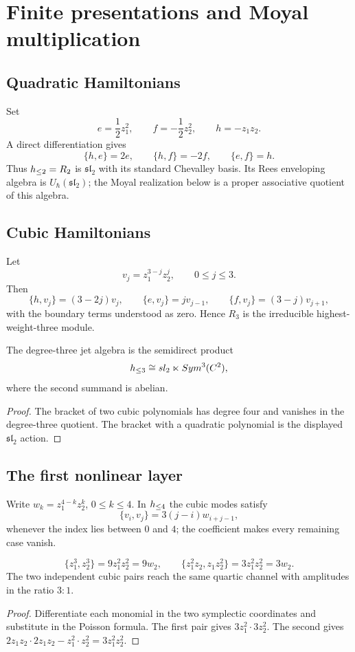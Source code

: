 \chapter{Finite presentations and Moyal multiplication}
\section{Quadratic Hamiltonians}
Set
\[
 e=\frac12z_1^2,
 \qquad
 f=-\frac12z_2^2,
 \qquad
 h=-z_1z_2.
\]
A direct differentiation gives
\[
 \{h,e\}=2e,
 \qquad
 \{h,f\}=-2f,
 \qquad
 \{e,f\}=h.
\]
Thus $h_{\le2}=R_2$ is $\mathfrak{sl}_2$ with its standard
Chevalley basis.  Its Rees enveloping algebra is
$U_\hbar(\mathfrak{sl}_2)$; the Moyal realization below is a proper
associative quotient of this algebra.

\section{Cubic Hamiltonians}
Let
\[
 v_j=z_1^{3-j}z_2^j,
 \qquad 0\le j\le3.
\]
Then
\[
 \{h,v_j\}=(3-2j)v_j,
 \qquad
 \{e,v_j\}=jv_{j-1},
 \qquad
 \{f,v_j\}=(3-j)v_{j+1},
\]
with the boundary terms understood as zero.  Hence $R_3$ is the irreducible highest-weight-three module.

\begin{proposition}
The degree-three jet algebra is the semidirect product
\[
 h_{\le3}\cong sl_2\ltimes Sym^3(C^2),
\]
where the second summand is abelian.
\end{proposition}
\begin{proof}
The bracket of two cubic polynomials has degree four and vanishes in the degree-three quotient.  The bracket with a quadratic polynomial is the displayed $\mathfrak{sl}_2$ action.
\end{proof}

\section{The first nonlinear layer}
Write $w_k=z_1^{4-k}z_2^k$, $0\le k\le4$.  In $h_{\le4}$ the cubic modes satisfy
\begin{equation}\label{eq:vol2-cubic-quartic}
 \{v_i,v_j\}=3(j-i)w_{i+j-1},
\end{equation}
whenever the index lies between $0$ and $4$; the coefficient makes every remaining case vanish.

\begin{calculation}
\[
 \{z_1^3,z_2^3\}=9z_1^2z_2^2=9w_2,
 \qquad
 \{z_1^2z_2,z_1z_2^2\}=3z_1^2z_2^2=3w_2.
\]
The two independent cubic pairs reach the same quartic channel with amplitudes in the ratio $3:1$.
\end{calculation}
\begin{proof}
Differentiate each monomial in the two symplectic coordinates and substitute in the Poisson formula.  The first pair gives $3z_1^2\cdot3z_2^2$.  The second gives $2z_1z_2\cdot2z_1z_2-z_1^2\cdot z_2^2=3z_1^2z_2^2$.
\end{proof}

